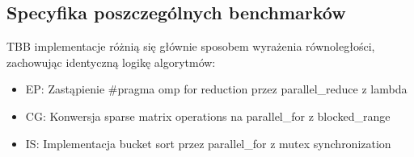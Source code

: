 \subsection{Specyfika poszczególnych benchmarków}
TBB implementacje różnią się głównie sposobem wyrażenia równoległości, zachowując identyczną logikę algorytmów:
\begin{itemize}
    \item EP: Zastąpienie \#pragma omp for reduction przez parallel\_reduce z lambda
    \item CG: Konwersja sparse matrix operations na parallel\_for z blocked\_range
    \item IS: Implementacja bucket sort przez parallel\_for z mutex synchronization
\end{itemize}
